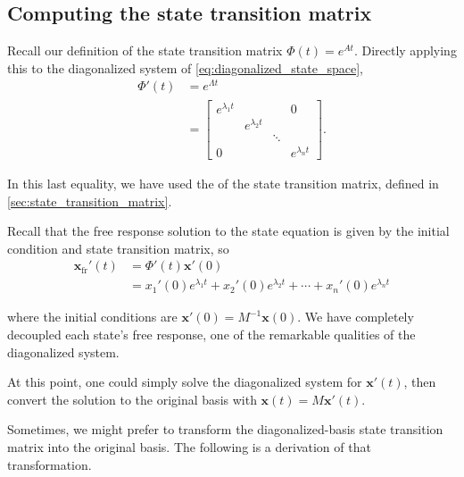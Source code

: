 \documentclass[dynamic_systems.tex]{subfiles}
\begin{document}
\subsection{Computing the state transition matrix}
\tags{}

Recall our definition of the state transition matrix $\Phi(t) = e^{A t}$.
Directly applying this to the diagonalized system of \autoref{eq:diagonalized_state_space},
\begin{subequations}
\begin{align}
	\Phi'(t) &= e^{\Lambda t} \\
	&= 
	\begin{bmatrix}
		e^{\lambda_1 t} & &  & 0 \\
		 & e^{\lambda_2 t} &  &  \\
		 & & \ddots & \\
		0 & & & e^{\lambda_n t}
	\end{bmatrix}.
\end{align}
\end{subequations}

In this last equality, we have used the  of the state transition matrix, defined in \autoref{sec:state_transition_matrix}.
\tags{}

Recall that the free response solution to the state equation is given by the initial condition and state transition matrix, so
\tags{}
\begin{subequations}
\begin{align}
	\bm{x}_\text{fr}'(t) &= \Phi'(t) \bm{x}'(0) \\
	&= x_1'(0) e^{\lambda_1 t} +
	x_2'(0) e^{\lambda_2 t} +
	\cdots +
	x_n'(0) e^{\lambda_n t}
\end{align}
\end{subequations}

where the initial conditions are $\bm{x}'(0) = M^{-1} \bm{x}(0)$.
We have completely decoupled each state's free response, one of the remarkable qualities of the diagonalized system.
\tags{}

At this point, one could simply solve the diagonalized system for $\bm{x}'(t)$, then convert the solution to the original basis with $\bm{x}(t) = M \bm{x}'(t)$.
\tags{}

Sometimes, we might prefer to transform the diagonalized-basis state transition matrix into the original basis.
The following is a derivation of that transformation.
\tags{}
\end{document}
